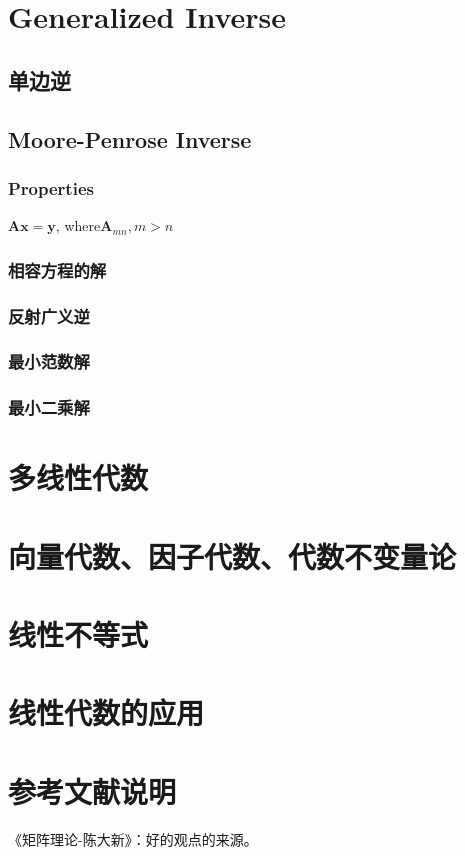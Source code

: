 \documentclass[UTF8]{../../09-Mathematics}
\begin{document}
\chapter{Generalized Inverse}


\section{单边逆}

\section{Moore-Penrose Inverse}


\subsection{Properties}
$\boldsymbol A \boldsymbol x = \boldsymbol y$, where$\boldsymbol A_{mn},m>n$



\subsection{相容方程的解}
\subsection{反射广义逆}
\subsection{最小范数解}
\subsection{最小二乘解}






\chapter{多线性代数}

\chapter{向量代数、因子代数、代数不变量论}


\chapter{线性不等式}

\chapter{线性代数的应用}




\chapter{参考文献说明}
《矩阵理论-陈大新》：好的观点的来源。


\end{document}
